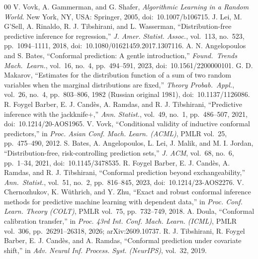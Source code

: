 \documentclass[conference]{IEEEtran}
\theoremstyle{definition}
\theoremstyle{remark}
\begin{document}
\begin{thebibliography}{00}
 V. Vovk, A. Gammerman, and G. Shafer, \textit{Algorithmic Learning in a Random World}. New York, NY, USA: Springer, 2005, doi:~10.1007/b106715.
 J. Lei, M. G'Sell, A. Rinaldo, R. J. Tibshirani, and L. Wasserman, ``Distribution-free predictive inference for regression,'' \textit{J. Amer. Statist. Assoc.}, vol.~113, no.~523, pp.~1094--1111, 2018, doi:~10.1080/01621459.2017.1307116.
 A. N. Angelopoulos and S. Bates, ``Conformal prediction: A gentle introduction,'' \textit{Found.\ Trends Mach.\ Learn.}, vol.~16, no.~4, pp.~494--591, 2023, doi:~10.1561/2200000101.
 G. D. Makarov, ``Estimates for the distribution function of a sum of two random variables when the marginal distributions are fixed,'' \textit{Theory Probab.\ Appl.}, vol.~26, no.~4, pp.~803--806, 1982 (Russian original 1981), doi:~10.1137/1126086.
 R. Foygel Barber, E. J. Cand\`es, A. Ramdas, and R. J. Tibshirani, ``Predictive inference with the jackknife+,'' \textit{Ann. Statist.}, vol.~49, no.~1, pp.~486--507, 2021, doi:~10.1214/20-AOS1965.
 V. Vovk, ``Conditional validity of inductive conformal predictors,'' in \textit{Proc. Asian Conf. Mach. Learn. (ACML)}, PMLR vol.~25, pp.~475--490, 2012.
 S. Bates, A. Angelopoulos, L. Lei, J. Malik, and M. I. Jordan, ``Distribution-free, risk-controlling prediction sets,'' \textit{J. ACM}, vol.~68, no.~6, pp.~1--34, 2021, doi:~10.1145/3478535.
 R. Foygel Barber, E. J. Cand\`es, A. Ramdas, and R. J. Tibshirani, ``Conformal prediction beyond exchangeability,'' \textit{Ann.\ Statist.}, vol.~51, no.~2, pp.~816--845, 2023, doi:~10.1214/23-AOS2276.
 V. Chernozhukov, K. W\"uthrich, and Y. Zhu, ``Exact and robust conformal inference methods for predictive machine learning with dependent data,'' in \textit{Proc. Conf. Learn. Theory (COLT)}, PMLR vol.~75, pp.~732--749, 2018.
 A. Doula, ``Conformal calibration transfer,'' in \textit{Proc. 43rd Int. Conf. Mach. Learn. (ICML)}, PMLR vol.~306, pp.~26291--26318, 2026; arXiv:2609.10737.
 R. J. Tibshirani, R. Foygel Barber, E. J. Cand\`es, and A. Ramdas, ``Conformal prediction under covariate shift,'' in \textit{Adv. Neural Inf. Process. Syst. (NeurIPS)}, vol.~32, 2019.
\end{thebibliography}
\end{document}
